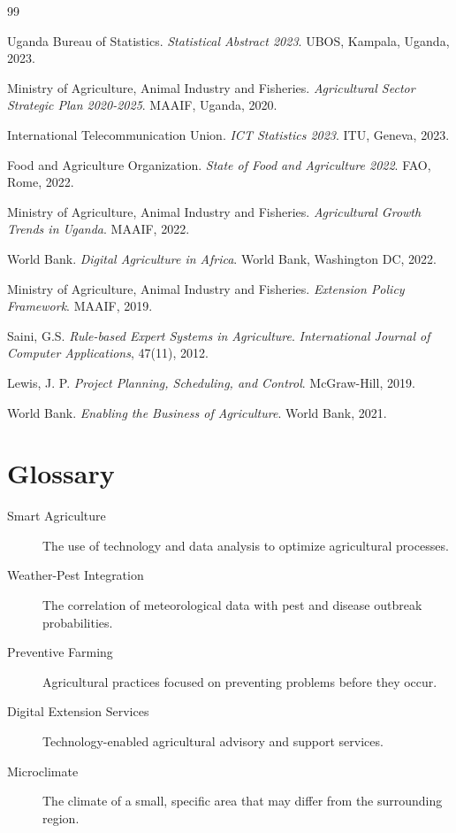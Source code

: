 \documentclass[12pt]{report}
\begin{document}
\begin{thebibliography}{99}

 Uganda Bureau of Statistics. \emph{Statistical Abstract 2023}. UBOS, Kampala, Uganda, 2023.

 Ministry of Agriculture, Animal Industry and Fisheries. \emph{Agricultural Sector Strategic Plan 2020-2025}. MAAIF, Uganda, 2020.

 International Telecommunication Union. \emph{ICT Statistics 2023}. ITU, Geneva, 2023.

 Food and Agriculture Organization. \emph{State of Food and Agriculture 2022}. FAO, Rome, 2022.

 Ministry of Agriculture, Animal Industry and Fisheries. \emph{Agricultural Growth Trends in Uganda}. MAAIF, 2022.

 World Bank. \emph{Digital Agriculture in Africa}. World Bank, Washington DC, 2022.

 Ministry of Agriculture, Animal Industry and Fisheries. \emph{Extension Policy Framework}. MAAIF, 2019.

 Saini, G.S. \emph{Rule-based Expert Systems in Agriculture}. \emph{International Journal of Computer Applications}, 47(11), 2012.

 Lewis, J. P. \emph{Project Planning, Scheduling, and Control}. McGraw-Hill, 2019.

 World Bank. \emph{Enabling the Business of Agriculture}. World Bank, 2021.

\end{thebibliography}

\newpage
{}
{}
\printindex

\newpage
{}
{}

\chapter*{Glossary}
\begin{description}
    \item[Smart Agriculture] The use of technology and data analysis to optimize agricultural processes.
    \item[Weather-Pest Integration] The correlation of meteorological data with pest and disease outbreak probabilities.
    \item[Preventive Farming] Agricultural practices focused on preventing problems before they occur.
    \item[Digital Extension Services] Technology-enabled agricultural advisory and support services.
    \item[Microclimate] The climate of a small, specific area that may differ from the surrounding region.
\end{description}
\end{document}
